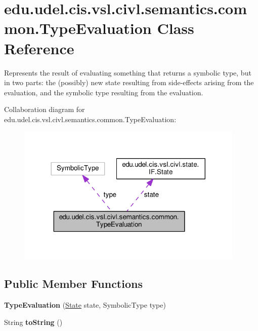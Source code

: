 \hypertarget{classedu_1_1udel_1_1cis_1_1vsl_1_1civl_1_1semantics_1_1common_1_1TypeEvaluation}{}\section{edu.\+udel.\+cis.\+vsl.\+civl.\+semantics.\+common.\+Type\+Evaluation Class Reference}
\label{classedu_1_1udel_1_1cis_1_1vsl_1_1civl_1_1semantics_1_1common_1_1TypeEvaluation}


Represents the result of evaluating something that returns a symbolic type, but in two parts\+: the (possibly) new state resulting from side-\/effects arising from the evaluation, and the symbolic type resulting from the evaluation.  




Collaboration diagram for edu.\+udel.\+cis.\+vsl.\+civl.\+semantics.\+common.\+Type\+Evaluation\+:
\nopagebreak
\begin{figure}[H]
\begin{center}
\leavevmode
\includegraphics[width=308pt]{classedu_1_1udel_1_1cis_1_1vsl_1_1civl_1_1semantics_1_1common_1_1TypeEvaluation__coll__graph}
\end{center}
\end{figure}
\subsection*{Public Member Functions}
\begin{DoxyCompactItemize}
\item 
\hypertarget{classedu_1_1udel_1_1cis_1_1vsl_1_1civl_1_1semantics_1_1common_1_1TypeEvaluation_a5b2f90c84c64c33dcbff5851ba585d7a}{}{\bfseries Type\+Evaluation} (\hyperlink{interfaceedu_1_1udel_1_1cis_1_1vsl_1_1civl_1_1state_1_1IF_1_1State}{State} state, Symbolic\+Type type)\label{classedu_1_1udel_1_1cis_1_1vsl_1_1civl_1_1semantics_1_1common_1_1TypeEvaluation_a5b2f90c84c64c33dcbff5851ba585d7a}

\item 
\hypertarget{classedu_1_1udel_1_1cis_1_1vsl_1_1civl_1_1semantics_1_1common_1_1TypeEvaluation_a82f7b2686802f3c4681d5bcf9a041ef9}{}String {\bfseries to\+String} ()\label{classedu_1_1udel_1_1cis_1_1vsl_1_1civl_1_1semantics_1_1common_1_1TypeEvaluation_a82f7b2686802f3c4681d5bcf9a041ef9}

\end{DoxyCompactItemize}
